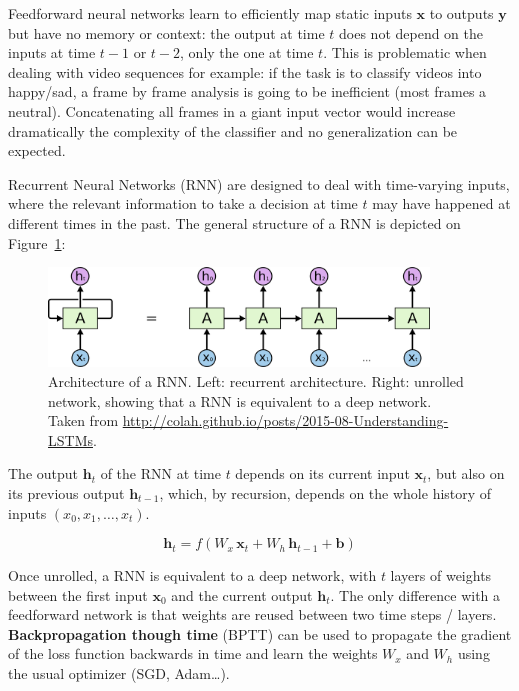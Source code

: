 \documentclass[
  letterpaper,
  DIV=11,
  numbers=noendperiod]{scrreprt}
\begin{document}
Feedforward neural networks learn to efficiently map static inputs
\(\mathbf{x}\) to outputs \(\mathbf{y}\) but have no memory or context:
the output at time \(t\) does not depend on the inputs at time \(t-1\)
or \(t-2\), only the one at time \(t\). This is problematic when dealing
with video sequences for example: if the task is to classify videos into
happy/sad, a frame by frame analysis is going to be inefficient (most
frames a neutral). Concatenating all frames in a giant input vector
would increase dramatically the complexity of the classifier and no
generalization can be expected.

Recurrent Neural Networks (RNN) are designed to deal with time-varying
inputs, where the relevant information to take a decision at time \(t\)
may have happened at different times in the past. The general structure
of a RNN is depicted on Figure~\ref{fig-rnn}:

\begin{figure}

{\centering \includegraphics[width=0.9\textwidth,height=\textheight]{./img/RNN-unrolled.png}

}

\caption{\label{fig-rnn}Architecture of a RNN. Left: recurrent
architecture. Right: unrolled network, showing that a RNN is equivalent
to a deep network. Taken from
\url{http://colah.github.io/posts/2015-08-Understanding-LSTMs}.}

\end{figure}

The output \(\mathbf{h}_t\) of the RNN at time \(t\) depends on its
current input \(\mathbf{x}_t\), but also on its previous output
\(\mathbf{h}_{t-1}\), which, by recursion, depends on the whole history
of inputs \((x_0, x_1, \ldots, x_t)\).

\[
    \mathbf{h}_t = f(W_x \, \mathbf{x}_{t} + W_h \, \mathbf{h}_{t-1} + \mathbf{b})
\]

Once unrolled, a RNN is equivalent to a deep network, with \(t\) layers
of weights between the first input \(\mathbf{x}_0\) and the current
output \(\mathbf{h}_t\). The only difference with a feedforward network
is that weights are reused between two time steps / layers.
\textbf{Backpropagation though time} (BPTT) can be used to propagate the
gradient of the loss function backwards in time and learn the weights
\(W_x\) and \(W_h\) using the usual optimizer (SGD, Adam\ldots).
\end{document}
